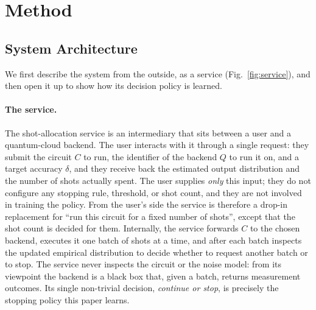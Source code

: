 \documentclass[runningheads]{llncs}
\begin{document}
\section{Method}
\label{sec:method}

\subsection{System Architecture}

We first describe the system from the outside, as a service (Fig.~\ref{fig:service}),
and then open it up to show how its decision policy is learned.

\paragraph{The service.} The shot-allocation service is an intermediary that sits
between a user and a quantum-cloud backend. The user interacts with it through a
single request: they submit the circuit $C$ to run, the identifier of the
backend $Q$ to run it on, and a target accuracy $\delta$, and they receive back
the estimated output distribution and the number of shots actually spent. The
user supplies \emph{only} this input; they do not configure any stopping rule,
threshold, or shot count, and they are not involved in training the policy. From
the user's side the service is therefore a drop-in replacement for ``run this
circuit for a fixed number of shots'', except that the shot count is decided for
them. Internally, the service forwards $C$ to the chosen backend, executes it one
batch of shots at a time, and after each batch inspects the updated empirical
distribution to decide whether to request another batch or to stop. The service
never inspects the circuit or the noise model: from its viewpoint the backend is
a black box that, given a batch, returns measurement outcomes. Its single
non-trivial decision, \emph{continue or stop}, is precisely the stopping policy
this paper learns.
\end{document}
